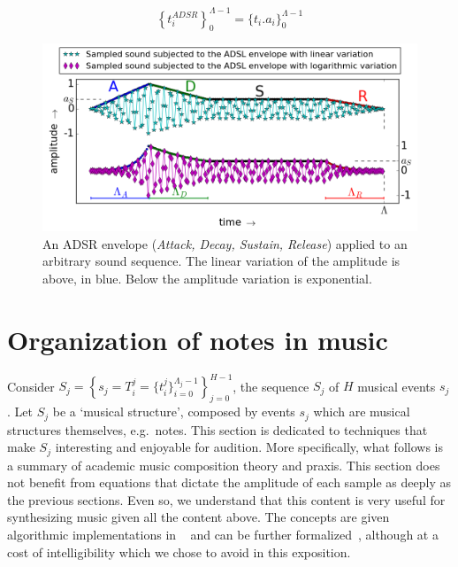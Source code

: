 \begin{equation}\label{eq:adsrApl}
\left\{t_i^{ADSR}\right\}_0^{\Lambda-1} =\{t_i . a_i\}_0^{\Lambda-1}
\end{equation}

\begin{figure}[htp!]
    \centering
        \includegraphics[width=\columnwidth]{figures/adsr_}
    \caption{An ADSR envelope (\emph{Attack, Decay, Sustain, Release}) applied to an arbitrary sound sequence. The linear variation of the amplitude is above, in blue. Below the amplitude variation is exponential.}
        \label{fig:adsr}
\end{figure}





\section{Organization of notes in music}\label{notasMusica} \label{sec:notesMusic}
Consider $S_j=\left\{  s_j=T_i^j=\{t_i^j\}_{i=0}^{\Lambda_j-1} \right\}_{j=0}^{H-1}$, the sequence $S_j$ of $H$ musical events $s_j$. Let $S_j$ be a `musical structure', composed by events $s_j$ which are musical structures themselves, e.g.\ notes. This section is dedicated to techniques that make $S_j$ interesting and enjoyable for audition. More specifically, what follows is a summary of academic music composition theory and praxis.
This section does not benefit from equations that dictate the amplitude of each sample as deeply as the previous sections.
Even so, we understand that this content is very useful for synthesizing music given all the content above.
The concepts are given algorithmic implementations in \mass~\cite{SI} and can be further formalized~\cite{topos},
although at a cost of intelligibility which we chose to avoid in this exposition.

